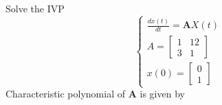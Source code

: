 \documentclass[]{article}
\begin{document}
\begin{example}
    Solve the IVP
    \begin{equation}
        \begin{cases}
            \displaystyle \frac{dx(t)}{dt} = \mathbf{A}X(t)
            \\
            A =
            \begin{bmatrix}
                1 & 12 \\
                3 & 1
            \end{bmatrix}
            \\
            x(0) =
            \begin{bmatrix}
                0 \\
                1
            \end{bmatrix}
        \end{cases}
    \end{equation}
    Characteristic polynomial of $\mathbf{A}$ is given by


\end{example}
\end{document}
